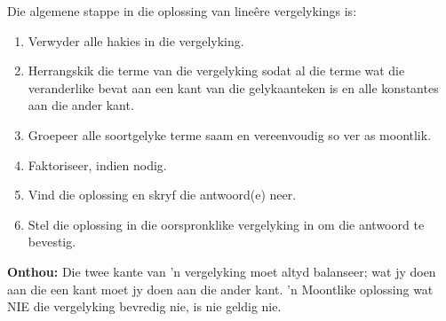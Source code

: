 Die algemene stappe in die oplossing van lineêre vergelykings is:
\begin{enumerate}[noitemsep, label=\textbf{\arabic*}. ] 
    \item Verwyder alle hakies in die vergelyking.
    \item Herrangskik die terme van die vergelyking sodat al die terme wat die veranderlike bevat aan een kant van die gelykaanteken is en alle konstantes aan die ander kant.
    \item Groepeer alle soortgelyke terme saam en vereenvoudig so ver as moontlik.
\item Faktoriseer, indien nodig.
    \item Vind die oplossing en skryf die antwoord(e) neer.
    \item Stel die oplossing in die oorspronklike vergelyking in om die antwoord te bevestig.
\end{enumerate}

\textbf{Onthou: } Die twee kante van 'n vergelyking moet altyd balanseer; wat jy doen aan die een kant moet jy doen aan die ander kant. 'n Moontlike oplossing wat NIE die vergelyking bevredig nie, is nie geldig nie.

